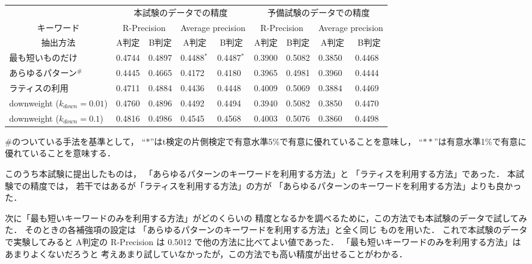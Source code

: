 \begin{table*}[t]
\begin{center}
\begin{tabular}[c]{|@{ }l@{ }||l|l|l|l||l|l|l|l|}\hline
 & \multicolumn{4}{c||}{本試験のデータでの精度} & \multicolumn{4}{c|}{予備試験のデータでの精度} \\\cline{2-9}
\multicolumn{1}{|c||}{キーワード}  & \multicolumn{2}{c|}{R-Precision} & \multicolumn{2}{c||}{Average precision} & \multicolumn{2}{c|}{R-Precision} & \multicolumn{2}{c|}{Average precision} \\\cline{2-9}
\multicolumn{1}{|c||}{抽出方法} & \multicolumn{1}{c|}{A判定}  & \multicolumn{1}{c|}{B判定} & \multicolumn{1}{c|}{A判定}  & \multicolumn{1}{c||}{B判定} & \multicolumn{1}{c|}{A判定}  & \multicolumn{1}{c|}{B判定} & \multicolumn{1}{c|}{A判定}  & \multicolumn{1}{c|}{B判定}  \\\hline 
最も短いものだけ   & 0.4744  & 0.4897  & 0.4488$^{*}$  & 0.4487$^{*}$  & 0.3900  & 0.5082  & 0.3850  & 0.4468\\
あらゆるパターン$^{\#}$   & 0.4445  & 0.4665  & 0.4172  & 0.4180  & 0.3965  & 0.4981  & 0.3960  & 0.4444\\
ラティスの利用     & 0.4711  & 0.4884  & 0.4436  & 0.4448  & 0.4009  & 0.5069  & 0.3884  & 0.4469 \\
downweight ($k_{down} = 0.01$) & 0.4760  & 0.4896  & 0.4492  & 0.4494  & 0.3940  & 0.5082  & 0.3850  & 0.4470\\
downweight ($k_{down} = 0.1$)  & 0.4816  & 0.4986  & 0.4545  & 0.4568  & 0.4003  & 0.5076  & 0.3860  & 0.4498\\\hline
\end{tabular}

\begin{minipage}[h]{14cm}
$\#$のついている手法を基準として，
``$*$''はt検定の片側検定で有意水準5\%で有意に優れていることを意味し，
``$**$''は有意水準1\%で有意に優れていることを意味する．
\end{minipage}

\end{center}
\end{table*}

このうち本試験に提出したものは，
「あらゆるパターンのキーワードを利用する方法」と
「ラティスを利用する方法」であった．
本試験での精度では，
若干ではあるが「ラティスを利用する方法」の方が
「あらゆるパターンのキーワードを利用する方法」よりも良かった．

次に「最も短いキーワードのみを利用する方法」がどのくらいの
精度となるかを調べるために，この方法でも本試験のデータで試してみた．
そのときの各補強項の設定は
「あらゆるパターンのキーワードを利用する方法」と全く同じ
ものを用いた．
これで本試験のデータで実験してみると
A判定の R-Precision は 0.5012 で他の方法に比べてよい値であった．
「最も短いキーワードのみを利用する方法」はあまりよくないだろうと
考えあまり試していなかったが，この方法でも高い精度が出せることがわかる．

